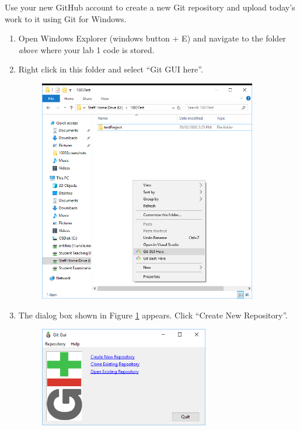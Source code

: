 \documentclass{lab}
\begin{document}
\begin{task}{}{}
Use your new GitHub account to create a new Git repository and upload today's work to it using Git for Windows.

\begin{enumerate}

\item Open Windows Explorer (windows button + E) and navigate to the folder \textit{above} where your lab 1 code is stored.

\item Right click in this folder and select ``Git GUI here''.

\begin{figure}[H]
\begin{center}
\includegraphics[width=0.9\textwidth]{Wk1Images/git1}
\end{center}
\end{figure}

\pagebreak
\item The dialog box shown in Figure \ref{fig:gitguicreate} appears. Click ``Create New Repository''.

\begin{figure}[H]
\begin{center}
\includegraphics[width=0.7\textwidth]{Wk1Images/git2}
\end{center}
\caption{}
\label{fig:gitguicreate}
\end{figure}


\end{enumerate}
\end{task}
\end{document}
